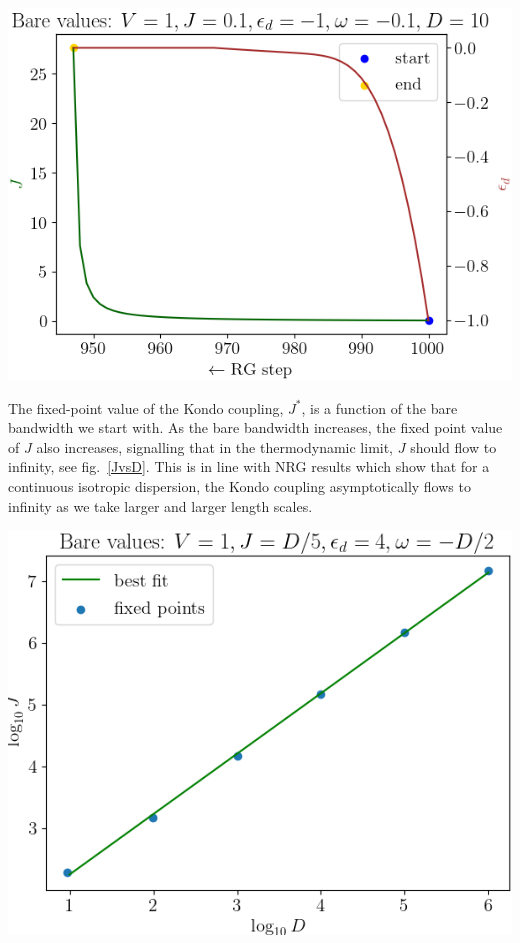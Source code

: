 \documentclass[12pt,twoside]{article}
\numberwithin{equation}{section}
\begin{document}
{\begin{center}
	\includegraphics[scale=0.38]{../figures/ed_to_zero2.png}
	\label{flowdown}
\end{center}
\begin{minipage}{190pt}
The fixed-point value of the Kondo coupling, \(J^*\), is a function of the bare bandwidth we start with. As the bare bandwidth increases, the fixed point value of \(J\) also increases, signalling that in the thermodynamic limit, \(J\) should flow to infinity, see fig.~\ref{JvsD}. This is in line with NRG results which show that for a continuous isotropic dispersion, the Kondo coupling asymptotically flows to infinity as we take larger and larger length scales.
\end{minipage}
\hspace*{20pt}
\begin{minipage}{260pt}
\begin{center}
	\includegraphics[scale=0.6]{../figures/J_vs_D_finite_w_both_log.png}
	\label{JvsD}
\end{center}
\end{minipage}
}
\end{document}
